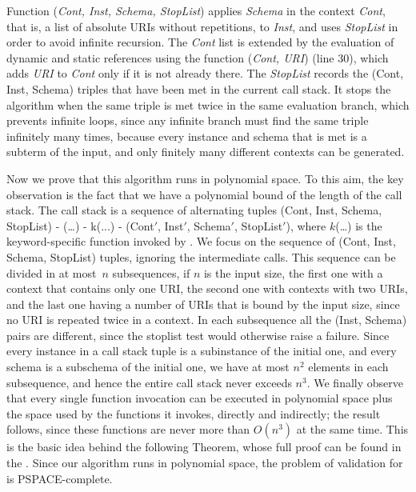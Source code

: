Function \SchemaValidate(\emph{Cont, Inst, Schema, StopList}) applies \emph{Schema} in the context
\emph{Cont}, that is, a list of absolute URIs without repetitions, to \emph{Inst}, and uses \emph{StopList}
in order to avoid infinite recursion. 
The \emph{Cont} list is extended by the evaluation of dynamic and static references using the
function {\Saturate(\emph{Cont, URI})} (line 30),
which adds \emph{URI} to \emph{Cont} only if it is not already there.
The \emph{StopList} records the
(Cont, Inst, Schema) triples that have been met in the current call stack.
It stops the algorithm when the same triple is met twice in the same evaluation branch,
which prevents infinite loops, since any infinite branch
must find the same triple infinitely many times, because every instance and schema that is met
is a subterm of the input, and only finitely many different contexts can be generated.

Now we prove that this algorithm runs in polynomial space. To this aim, the key observation is the fact that we
have a polynomial bound of the length of the call stack.
The call stack is a sequence of alternating tuples 
\SchemaValidate(Cont, Inst, Schema, StopList) - 
\KeywordValidate(\ldots) -
k(...) -
\SchemaValidate(Cont$'$, Inst$'$, Schema$'$, StopList$'$), 
where $k$(\dots) is the keyword-specific function invoked by \KeywordValidate.
We focus on the sequence of \SchemaValidate(Cont, Inst, Schema, StopList) tuples,
ignoring the intermediate calls. This sequence
can be divided in at most~$n$ subsequences, if $n$ is the input size,
the first one with a context that contains only one
URI, the second one with contexts with two URIs, and the last one having a number of URIs that is bound by the input size,
since no URI is repeated twice in a context. In each subsequence all the (Inst, Schema) pairs are different,
since the stoplist test would otherwise raise a failure. Since every instance in a call stack tuple
is a subinstance of the initial one, and every schema is a subschema of the initial one, we have at
most $n^2$ elements in each subsequence, and hence the entire call stack never exceeds $n^3$.
We finally observe that every single function invocation can be executed in polynomial space plus the space used by the functions it invokes, directly and indirectly; the result follows, since these functions are never more
than $O(n^3)$ at the same time.
This is the basic idea behind the following Theorem, whose full proof can be found in the {\FV}.
Since our algorithm runs in polynomial space, the problem of validation
for {\mJS} is PSPACE-complete.

